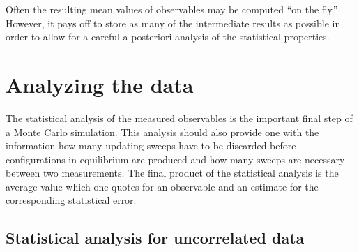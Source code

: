Often the resulting mean values of observables may be computed ``on the
fly.'' However, it pays off to store as many of the intermediate results as
possible in order to allow for a careful a posteriori analysis of the statistical
properties.

\section{Analyzing the data}

The statistical analysis of the measured observables is the important final
step of a Monte Carlo simulation. This analysis should also provide one with
the information how many updating sweeps have to be discarded before configurations in equilibrium are produced and how many sweeps are necessary
between two measurements. The final product of the statistical analysis is
the average value which one quotes for an observable and an estimate for the
corresponding statistical error.

\subsection{Statistical analysis for uncorrelated data}

